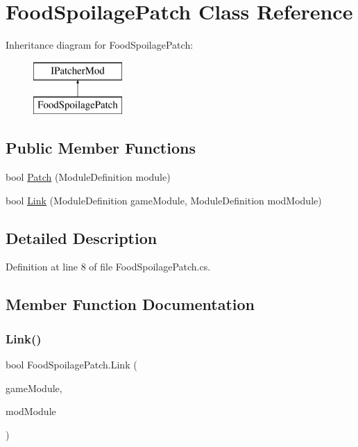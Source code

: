 \hypertarget{class_food_spoilage_patch}{}\section{Food\+Spoilage\+Patch Class Reference}
\label{class_food_spoilage_patch}
Inheritance diagram for Food\+Spoilage\+Patch\+:\begin{figure}[H]
\begin{center}
\leavevmode
\includegraphics[height=2.000000cm]{df/df5/class_food_spoilage_patch}
\end{center}
\end{figure}
\subsection*{Public Member Functions}
\begin{DoxyCompactItemize}
\item 
bool \mbox{\hyperlink{class_food_spoilage_patch_a68168b94551e581dc9e44fe4c0f5354c}{Patch}} (Module\+Definition module)
\item 
bool \mbox{\hyperlink{class_food_spoilage_patch_a4ffacf1f1626d104d194894b8c3d8714}{Link}} (Module\+Definition game\+Module, Module\+Definition mod\+Module)
\end{DoxyCompactItemize}


\subsection{Detailed Description}


Definition at line 8 of file Food\+Spoilage\+Patch.\+cs.



\subsection{Member Function Documentation}
\mbox{\label{class_food_spoilage_patch_a4ffacf1f1626d104d194894b8c3d8714}} 
\subsubsection{\texorpdfstring{Link()}{Link()}}
{\footnotesize\ttfamily bool Food\+Spoilage\+Patch.\+Link (\begin{DoxyParamCaption}\item[{Module\+Definition}]{game\+Module,  }\item[{Module\+Definition}]{mod\+Module }\end{DoxyParamCaption})}



